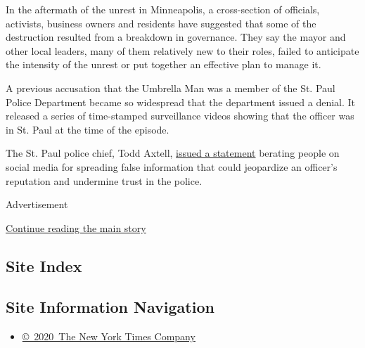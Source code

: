 In the aftermath of the unrest in Minneapolis, a cross-section of
officials, activists, business owners and residents have suggested that
some of the destruction resulted from a breakdown in governance. They
say the mayor and other local leaders, many of them relatively new to
their roles, failed to anticipate the intensity of the unrest or put
together an effective plan to manage it.

A previous accusation that the Umbrella Man was a member of the St. Paul
Police Department became so widespread that the department issued a
denial. It released a series of time-stamped surveillance videos showing
that the officer was in St. Paul at the time of the episode.

The St. Paul police chief, Todd Axtell,
\href{https://www.stpaul.gov/news/surveillance-video-confirms-saint-paul-police-officer-jacob-pederson-not-\%E2\%80\%98umbrella-man\%E2\%80\%99\#:~:text=Monday\%2C\%20May\%2027.-,The\%20Saint\%20Paul\%20Police\%20Department\%20today\%20(Monday\%2C\%20June\%208),the\%20rumor\%20on\%20May\%2028.}{issued
a statement} berating people on social media for spreading false
information that could jeopardize an officer's reputation and undermine
trust in the police.

Advertisement

\protect\hyperlink{after-bottom}{Continue reading the main story}

\hypertarget{site-index}{%
\subsection{Site Index}\label{site-index}}

\hypertarget{site-information-navigation}{%
\subsection{Site Information
Navigation}\label{site-information-navigation}}

\begin{itemize}
\tightlist
\item
  \href{https://help.nytimes3xbfgragh.onion/hc/en-us/articles/115014792127-Copyright-notice}{©~2020~The
  New York Times Company}
\end{itemize}

